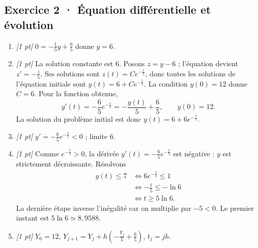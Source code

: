 \subsection*{Exercice 2 · Équation différentielle et évolution}\begin{enumerate}

\item \textit{[1 pt]} $0=-\frac{1}{5}y+\frac{6}{5}$ donne $y=6$.

\item \textit{[1 pt]} La solution constante est $6$. Posons $z=y-6$ ; l'équation devient $z'=-\frac{z}{5}$. Ses solutions sont $z(t)=Ce^{-\frac{t}{5}}$, donc toutes les solutions de l'équation initiale sont $y(t)=6+Ce^{-\frac{t}{5}}$.
La condition $y(0)=12$ donne $C=6$. Pour la fonction obtenue,
\[y'(t)=-\frac{6}{5}e^{-\frac{t}{5}}=-\frac{y(t)}{5}+\frac{6}{5},\qquad y(0)=12.\]
La solution du problème initial est donc $y(t)=6+6e^{-\frac{t}{5}}$.

\item \textit{[1 pt]} $y'=-\frac{6}{5}e^{-\frac{t}{5}}<0$ ; limite $6$.

\item \textit{[1 pt]} Comme $e^{-\frac{t}{5}}>0$, la dérivée $y'(t)=-\frac{6}{5}e^{-\frac{t}{5}}$ est négative : $y$ est strictement décroissante. Résolvons
\[\begin{aligned}y(t)\le 7&\Longleftrightarrow 6e^{-\frac{t}{5}}\le1\\&\Longleftrightarrow -\frac{t}{5}\le-\ln 6\\&\Longleftrightarrow t\ge 5\ln 6.\end{aligned}\]
La dernière étape inverse l'inégalité car on multiplie par $-5<0$. Le premier instant est $5\ln 6\simeq8{,}9588$.

\item \textit{[1 pt]} $Y_0=12$, $Y_{j+1}=Y_j+h(-\frac{Y_j}{5}+\frac{6}{5})$, $t_j=jh$.

\end{enumerate}

